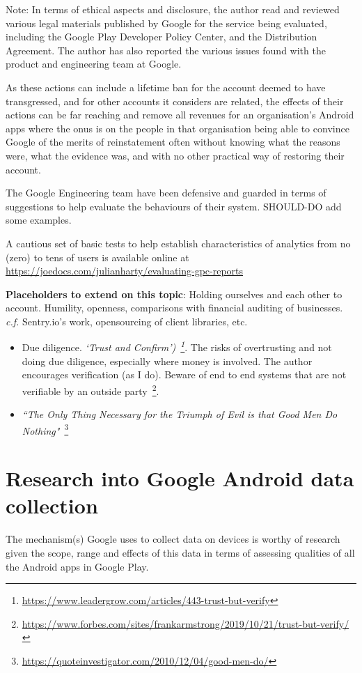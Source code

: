 Note: In terms of ethical aspects and disclosure, the author read and reviewed various legal materials published by Google for the service being evaluated, including the Google Play Developer Policy Center\cite{google_play_developer_policy_center}, and the Distribution Agreement\cite{google_play_developer_distribution_agreement}. The author has also reported the various issues found with the product and engineering team at Google.




As these actions can include a lifetime ban for the account deemed to have transgressed, and for other accounts it considers are related, the effects of their actions can be far reaching and remove all revenues for an organisation's Android apps where the onus is on the people in that organisation being able to convince Google of the merits of reinstatement often without knowing what the reasons were, what the evidence was, and with no other practical way of restoring their account.

The Google Engineering team have been defensive and guarded in terms of suggestions to help evaluate the behaviours of their system. SHOULD-DO add some examples. 

A cautious set of basic tests to help establish characteristics of analytics from no (zero) to tens of users is available online at 
\url{https://joedocs.com/julianharty/evaluating-gpc-reports}

\textbf{Placeholders to extend on this topic}: Holding ourselves and each other to account. Humility, openness, comparisons with financial auditing of businesses. \emph{c.f.} Sentry.io's work, opensourcing of client libraries, etc. 

\begin{itemize}
    \item Due diligence. \emph{`Trust and Confirm')~\footnote{\url{https://www.leadergrow.com/articles/443-trust-but-verify}}}. The risks of overtrusting and not doing due diligence, especially where money is involved. The author encourages verification (as I do). Beware of end to end systems that are not verifiable by an outside party~\footnote{\url{https://www.forbes.com/sites/frankarmstrong/2019/10/21/trust-but-verify/}}.
    \item \emph{``The Only Thing Necessary for the Triumph of Evil is that Good Men Do Nothing"}~\footnote{\url{https://quoteinvestigator.com/2010/12/04/good-men-do/}}
\end{itemize}

\section{Research into Google Android data collection}
The mechanism(s) Google uses to collect data on devices is worthy of research given the scope, range and effects of this data in terms of assessing qualities of all the Android apps in Google Play.

